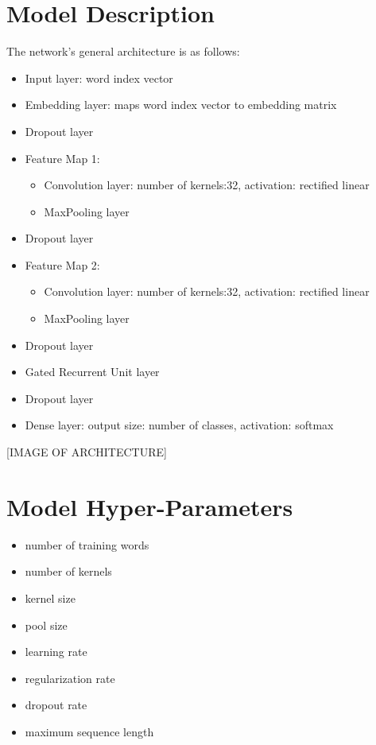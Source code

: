 \section{Model Description}
The network's general architecture is as follows:
\begin{itemize}
  \item Input layer: word index vector
  \item Embedding layer: maps word index vector to embedding matrix
  \item Dropout layer
  \item Feature Map 1:
      \begin{itemize}
        \item Convolution layer: number of kernels:32, activation: rectified linear
        \item MaxPooling layer
      \end{itemize}
\item Dropout layer
\item Feature Map 2:
    \begin{itemize}
      \item Convolution layer: number of kernels:32, activation: rectified linear
      \item MaxPooling layer
    \end{itemize}
\item Dropout layer
\item Gated Recurrent Unit layer
\item Dropout layer
\item Dense layer: output size: number of classes, activation: softmax
\end{itemize}
[IMAGE OF ARCHITECTURE]

\section{Model Hyper-Parameters}
\begin{itemize}
  \item number of training words
  \item number of kernels
  \item kernel size
  \item pool size
  \item learning rate
  \item regularization rate
  \item dropout rate
  \item maximum sequence length

\end{itemize}

